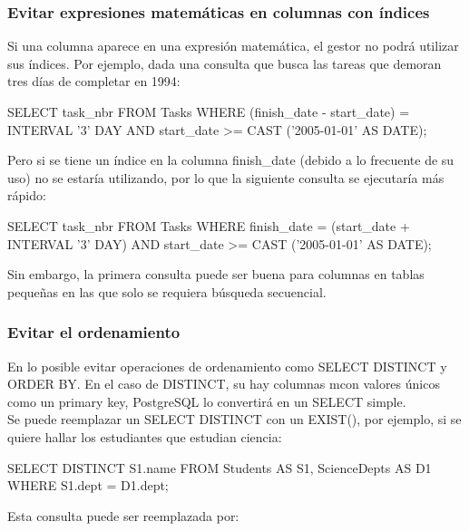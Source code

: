 \subsubsection{Evitar expresiones matemáticas en columnas con índices}

Si una columna aparece en una expresión matemática, el gestor no podrá utilizar sus índices. Por ejemplo, dada una consulta que busca las tareas que demoran tres días de completar en 1994:\\

\begin{pyglist}
SELECT task_nbr
  FROM Tasks
 WHERE (finish_date - start_date) = INTERVAL '3' DAY
   AND start_date >= CAST ('2005-01-01' AS DATE);
\end{pyglist}

Pero si se tiene un índice en la columna finish\_date (debido a lo frecuente de su uso) no se estaría utilizando, por lo que la siguiente consulta se ejecutaría más rápido:\\

\begin{pyglist}
SELECT task_nbr
  FROM Tasks
 WHERE finish_date = (start_date + INTERVAL '3' DAY)
   AND start_date >= CAST ('2005-01-01' AS DATE);
\end{pyglist}

Sin embargo, la primera consulta puede ser buena para columnas en tablas pequeñas en las que solo se requiera búsqueda secuencial.

\subsubsection{Evitar el ordenamiento}

En lo posible evitar operaciones de ordenamiento como SELECT DISTINCT y ORDER BY. En el caso de DISTINCT, su hay columnas mcon valores únicos como un primary key, PostgreSQL lo convertirá en un SELECT simple. \cite{CELKO2005} \\

Se puede reemplazar un SELECT DISTINCT con un EXIST(), por ejemplo, si se quiere hallar los estudiantes que estudian ciencia:\\

\begin{pyglist}
SELECT DISTINCT S1.name
  FROM Students AS S1, ScienceDepts AS D1
 WHERE S1.dept = D1.dept;
\end{pyglist}

Esta consulta puede ser reemplazada por:\\

